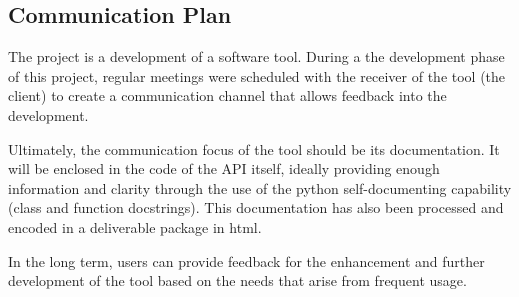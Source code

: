 \documentclass[a4paper, 11pt]{report}
\begin{document}
\subsection{Communication Plan}
    The project is a development of a software tool. During a the development phase of this project, regular meetings were scheduled with the receiver of the tool (the client) to create a communication channel that allows feedback into the development.

    Ultimately, the communication focus of the tool should be its documentation. It will be enclosed in the code of the API itself, ideally providing enough information and clarity through the use of the python self-documenting capability (class and function docstrings).  This documentation has also been processed and encoded in a deliverable package in html.

    In the long term, users can provide feedback for the enhancement and further development of the tool based on the needs that arise from frequent usage.
\end{document}
